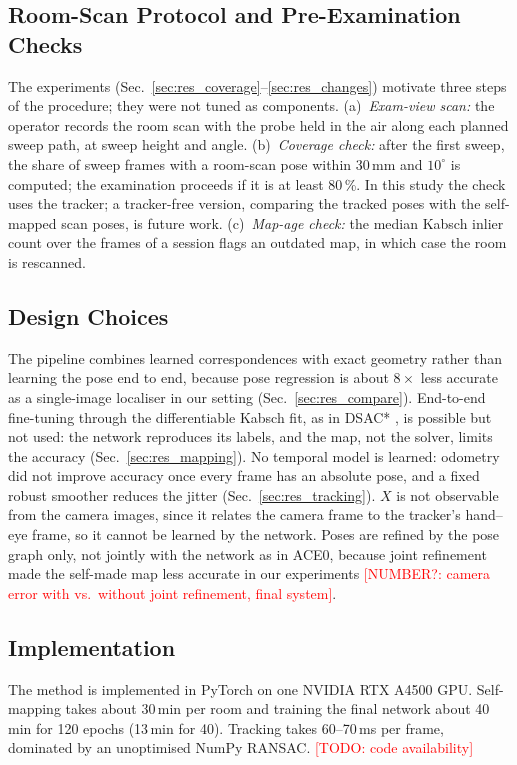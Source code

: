 \documentclass[journal]{IEEEtran}
\newcommand{\tbd}[1]{\textcolor{red}{[TODO: #1]}}
\newcommand{\NUMQ}[1]{\textcolor{red}{[NUMBER?: #1]}}
\begin{document}
\subsection{Room-Scan Protocol and Pre-Examination Checks}
\label{sec:protocol}
The experiments (Sec.~\ref{sec:res_coverage}--\ref{sec:res_changes}) motivate three steps of the procedure; they were not tuned as components. (a)~\emph{Exam-view scan:} the operator records the room scan with the probe held in the air along each planned sweep path, at sweep height and angle. (b)~\emph{Coverage check:} after the first sweep, the share of sweep frames with a room-scan pose within 30\,mm and $10^\circ$ is computed; the examination proceeds if it is at least 80\,\%. In this study the check uses the tracker; a tracker-free version, comparing the tracked poses with the self-mapped scan poses, is future work. (c)~\emph{Map-age check:} the median Kabsch inlier count over the frames of a session flags an outdated map, in which case the room is rescanned.

\subsection{Design Choices}
\label{sec:design}
The pipeline combines learned correspondences with exact geometry rather than learning the pose end to end, because pose regression is about $8\times$ less accurate as a single-image localiser in our setting (Sec.~\ref{sec:res_compare}). End-to-end fine-tuning through the differentiable Kabsch fit, as in DSAC* \cite{brachmann2022dsac}, is possible but not used: the network reproduces its labels, and the map, not the solver, limits the accuracy (Sec.~\ref{sec:res_mapping}). No temporal model is learned: odometry did not improve accuracy once every frame has an absolute pose, and a fixed robust smoother reduces the jitter (Sec.~\ref{sec:res_tracking}). $X$ is not observable from the camera images, since it relates the camera frame to the tracker's hand--eye frame, so it cannot be learned by the network. Poses are refined by the pose graph only, not jointly with the network as in ACE0, because joint refinement made the self-made map less accurate in our experiments \NUMQ{camera error with vs.\ without joint refinement, final system}.

\subsection{Implementation}
\label{sec:implementation}
The method is implemented in PyTorch on one NVIDIA RTX A4500 GPU. Self-mapping takes about 30\,min per room and training the final network about 40\,min for 120 epochs (13\,min for 40). Tracking takes 60--70\,ms per frame, dominated by an unoptimised NumPy RANSAC. \tbd{code availability}
\end{document}
